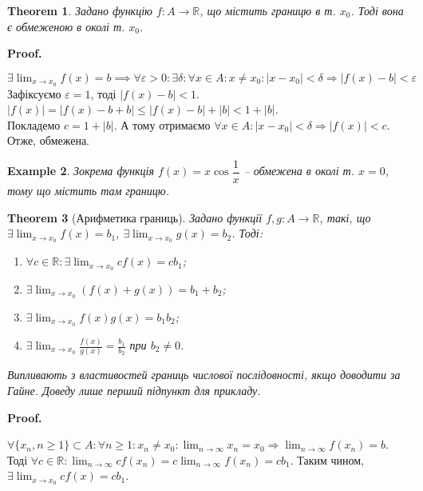 \documentclass[a4paper, 14pt]{article}
\makeatletter
\def\qed{$\blacksquare$}
\theoremstyle{theoremdd}
\newtheorem{theorem}{Theorem}[subsection]
\theoremstyle{theoremdd}
\theoremstyle{theoremdd}
\theoremstyle{theoremdd}
\newtheorem{example}[theorem]{Example}
\theoremstyle{theoremdd}
\theoremstyle{theoremdd}
\theoremstyle{theoremdd}
\theoremstyle{theoremdd}
\renewenvironment{proof}[1][Proof.\\]{\par
\pushQED{\hfill \qed}%
\normalfont \topsep6\p@\@plus6\p@\relax
\trivlist
\item\relax
{\bfseries
#1\@addpunct{.}}\hspace\labelsep\ignorespaces
}{%
\popQED\endtrivlist\@endpefalse
}
\makeatother
\begin{document}
	\begin{theorem} Задано функцію $f \colon A \to \mathbb{R}$, що містить границю в т. $x_0$. Тоді вона є обмеженою в околі т. $x_0$.
	\end{theorem}
	
	\begin{proof}
	$\exists \displaystyle \lim_{x \to x_0} f(x) = b \implies \forall \varepsilon > 0: \exists \delta: \forall x \in A: x \neq x_0: |x-x_0|<\delta \Rightarrow |f(x)-b|<\varepsilon$\\
	Зафіксуємо $\varepsilon = 1$, тоді $|f(x) -b| < 1$.\\
	$|f(x)| = |f(x) - b + b| \leq |f(x) - b| + |b| < 1 + |b|$.\\
	Покладемо $c = 1 + |b|$. А тому отримаємо $\forall x \in A: |x-x_0| < \delta \Rightarrow |f(x)| < c$. Отже, обмежена.
	\end{proof}
	
	\begin{example}
	Зокрема функція $f(x) = x \cos \dfrac{1}{x}$ -- обмежена в околі т. $x = 0$, тому що містить там границю.
	\end{example}
	
	\begin{theorem}[Арифметика границь]
	Задано функції $f,g \colon A \to \mathbb{R}$, такі, що $\exists \displaystyle \lim_{x \to x_0} f(x) = b_1$, $\exists \displaystyle \lim_{x \to x_0} g(x) = b_2$. Тоді:
	\begin{enumerate}[nosep,wide=0pt,label={\arabic*)}]
	\item $\forall c \in \mathbb{R}: \exists \displaystyle \lim_{x \to x_0} cf(x) = c b_1$;
	\item $\exists \displaystyle \lim_{x \to x_0} (f(x)+g(x)) = b_1 + b_2$;
	\item $\exists \displaystyle \lim_{x \to x_0} f(x)g(x) = b_1 b_2$;
	\item $\exists \displaystyle \lim_{x \to x_0} \frac{f(x)}{g(x)} = \frac{b_1}{b_2}$ при $b_2 \neq 0$.
	\end{enumerate}
	\textit{Випливають з властивостей границь числової послідовності, якщо доводити за Гайне. Доведу лише перший підпункт для прикладу.}
	\end{theorem}
	
	\begin{proof}
	$\forall \{x_n, n \geq 1\} \subset A: \forall n \geq 1: x_n \neq x_0: \displaystyle \lim_{n \to \infty} x_n = x_0 \Rightarrow \lim_{n \to \infty} f(x_n) = b$.\\
	Тоді $\displaystyle \forall c \in \mathbb{R}: \lim_{n \to \infty} c f(x_n) = c \lim_{n \to \infty} f(x_n) = c b_1$. Таким чином, $\exists \displaystyle \lim_{x \to x_0} cf(x) = c b_1$.
	\end{proof}
	
\end{document}
